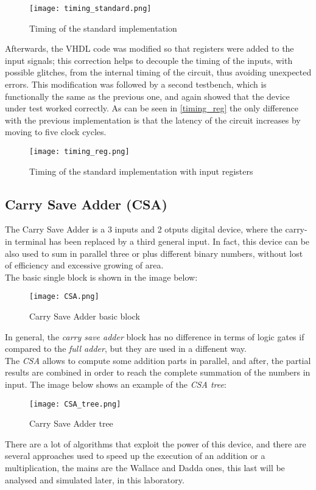 \begin{figure}[h]
	\center
	\texttt{[image: timing\_standard.png]}
	\caption{Timing of the standard implementation}
	\label{fig:timing_standard}
\end{figure}

Afterwards, the VHDL code was modified so that registers were added to the input signals; this correction helps to decouple the timing of the inputs, with possible glitches, from the internal timing of the circuit, thus avoiding unexpected errors.
This modification was followed by a second testbench, which is functionally the same as the previous one, and again showed that the device under test worked correctly. As can be seen in \autoref{timing_reg} the only difference with the previous implementation is that the latency of the circuit increases by moving to five clock cycles.

\begin{figure}[h]
	\center
	\texttt{[image: timing\_reg.png]}
	\caption{Timing of the standard implementation with input registers}
	\label{fig:timing_reg}
\end{figure}



\subsection{Carry Save Adder (CSA)}
The Carry Save Adder is a 3 inputs and 2 otputs digital device, where the carry-in terminal has been replaced by a third general input. In fact, this device can be also used to sum in parallel three or plus different binary numbers, without lost of efficiency and excessive growing of area. \\
The basic single block is shown in the image below:

\begin{figure}[H]
	\center
	\texttt{[image: CSA.png]}
	\caption{Carry Save Adder basic block}
	\label{fig:timing_reg}
\end{figure}

In general, the \textit{carry save adder} block has no difference in terms of logic gates if compared to the \textit{full adder}, but they are used in a diffenent way. \\
The \textit{CSA} allows to compute some addition parts in parallel, and after, the partial results are combined in order to reach the complete summation of the numbers in input. The image below shows an example of the \textit{CSA tree}:
\begin{figure}[H]
	\center
	\texttt{[image: CSA\_tree.png]}
	\caption{Carry Save Adder tree}
	\label{fig:timing_reg}
\end{figure}
There are a lot of algorithms that exploit the power of this device, and there are several approaches used to speed up the execution of an addition or a multiplication, the mains are the Wallace and Dadda ones, this last will be analysed and simulated later, in this laboratory.
